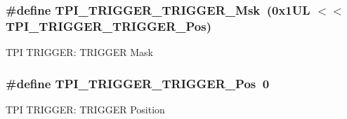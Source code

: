 \subsubsection[{\texorpdfstring{T\+P\+I\+\_\+\+T\+R\+I\+G\+G\+E\+R\+\_\+\+T\+R\+I\+G\+G\+E\+R\+\_\+\+Msk}{TPI_TRIGGER_TRIGGER_Msk}}]{\setlength{\rightskip}{0pt plus 5cm}\#define T\+P\+I\+\_\+\+T\+R\+I\+G\+G\+E\+R\+\_\+\+T\+R\+I\+G\+G\+E\+R\+\_\+\+Msk~(0x1\+U\+L $<$$<$ T\+P\+I\+\_\+\+T\+R\+I\+G\+G\+E\+R\+\_\+\+T\+R\+I\+G\+G\+E\+R\+\_\+\+Pos)}\hypertarget{group___c_m_s_i_s___t_p_i_ga814227af2b2665a0687bb49345e21110}{}\label{group___c_m_s_i_s___t_p_i_ga814227af2b2665a0687bb49345e21110}
T\+PI T\+R\+I\+G\+G\+ER\+: T\+R\+I\+G\+G\+ER Mask 
\subsubsection[{\texorpdfstring{T\+P\+I\+\_\+\+T\+R\+I\+G\+G\+E\+R\+\_\+\+T\+R\+I\+G\+G\+E\+R\+\_\+\+Pos}{TPI_TRIGGER_TRIGGER_Pos}}]{\setlength{\rightskip}{0pt plus 5cm}\#define T\+P\+I\+\_\+\+T\+R\+I\+G\+G\+E\+R\+\_\+\+T\+R\+I\+G\+G\+E\+R\+\_\+\+Pos~0}\hypertarget{group___c_m_s_i_s___t_p_i_ga5517fa2ced64efbbd413720329c50b99}{}\label{group___c_m_s_i_s___t_p_i_ga5517fa2ced64efbbd413720329c50b99}
T\+PI T\+R\+I\+G\+G\+ER\+: T\+R\+I\+G\+G\+ER Position 